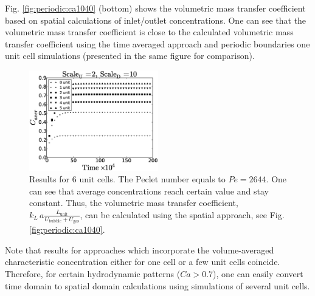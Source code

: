 \documentclass[preprint,12pt]{elsarticle}
\newcommand{\vol}{k_L\,a}
\newcommand{\lunit}{L_{\mathrm{unit}}}
\newcommand{\ububble}{U_{\mathrm{bubble}}}
\newcommand{\ugas}{U_{\mathrm{gas}}}
\newcommand{\volnondim}{\vol \frac{\lunit}{\ububble+\ugas}}
\begin{document}
Fig. \ref{fig:periodic:ca1040}
(bottom) shows the volumetric mass transfer coefficient based on spatial calculations of
inlet/outlet concentrations. One can see that the volumetric mass transfer coefficient is close to
the calculated volumetric mass transfer coefficient using the time averaged approach and periodic
boundaries one unit cell simulations (presented in the same figure for comparison).
\begin{figure}[htb!]
\begin{center}
\includegraphics[width=0.5\textwidth]{Figures/aver_units6scaleu2scaled5.eps}
\end{center}
\caption{Results for $6$ unit cells. The Peclet number equals to $Pe=2644$.
One can see that average concentrations reach certain value and stay constant.
Thus, the volumetric mass transfer coefficient, $\volnondim$, can be
calculated using the spatial approach, see Fig.
\ref{fig:periodic:ca1040}.
\label{fig:6:units:ca1040}}
\end{figure}
Note
that results for approaches which incorporate the volume-averaged characteristic concentration either for one cell or a few unit cells coincide. Therefore, for certain hydrodynamic patterns ($Ca>0.7$), one can
easily convert time domain to spatial domain calculations using simulations of several unit cells.
\end{document}
